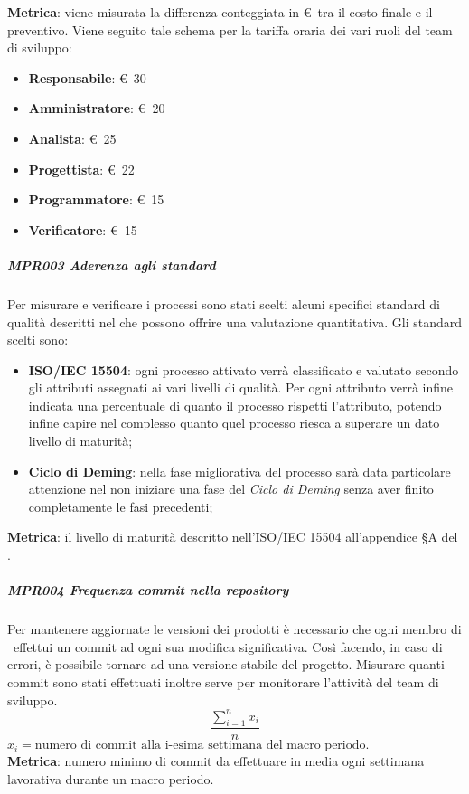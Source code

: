 				\textbf{Metrica}: viene misurata la differenza conteggiata in \euro\ tra il costo finale e il preventivo.
				Viene seguito tale schema per la tariffa oraria dei vari ruoli del team di sviluppo:

				\begin{itemize} %
					\item \textbf{Responsabile}: \euro\ 30
					\item \textbf{Amministratore}: \euro\ 20
					\item \textbf{Analista}: \euro\ 25
					\item \textbf{Progettista}: \euro\ 22
					\item \textbf{Programmatore}: \euro\ 15
					\item \textbf{Verificatore}: \euro\ 15
				\end{itemize}

				\subparagraph{MPR003 Aderenza agli standard}
				Per misurare e verificare i processi sono stati scelti alcuni specifici standard di qualità descritti nel \PdQ che possono offrire una valutazione quantitativa.
				Gli standard scelti sono:

				\begin{itemize}
				\item \textbf{ISO/IEC 15504}: ogni processo attivato verrà classificato e valutato secondo gli attributi assegnati ai vari livelli di qualità. Per ogni attributo verrà infine indicata una percentuale di quanto il processo rispetti l'attributo, potendo infine capire nel complesso quanto quel processo riesca a superare un dato livello di maturità;
				\item \textbf{Ciclo di Deming}: nella fase migliorativa del processo sarà data particolare attenzione nel non iniziare una fase del \textit{Ciclo di Deming} senza aver finito completamente le fasi precedenti;
				\end{itemize}

				\textbf{Metrica}: il livello di maturità descritto nell'ISO/IEC 15504 all'appendice §A del \Doc{\PdQv}.

				\subparagraph{MPR004 Frequenza commit nella repository}
				Per mantenere aggiornate le versioni dei prodotti è necessario che ogni membro di \gruppo\ effettui un commit ad ogni sua modifica significativa.
				Così facendo, in caso di errori, è possibile tornare ad una versione stabile del progetto.				
				Misurare quanti commit sono stati effettuati inoltre serve per monitorare l'attività del team di sviluppo.
				\[\dfrac{\sum_{i=1}^{n} x_i}{n}\]
				$x_i=\text{numero di commit alla i-esima settimana del macro periodo.}$\\
				\textbf{Metrica}: numero minimo di commit da effettuare in media ogni settimana lavorativa durante un macro periodo.

